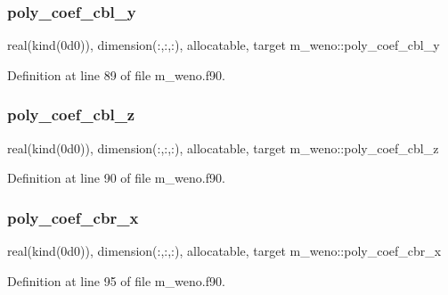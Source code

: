 \subsubsection{\texorpdfstring{poly\+\_\+coef\+\_\+cbl\+\_\+y}{poly\_coef\_cbl\_y}}
{\footnotesize\ttfamily real(kind(0d0)), dimension(\+:,\+:,\+:), allocatable, target m\+\_\+weno\+::poly\+\_\+coef\+\_\+cbl\+\_\+y}



Definition at line 89 of file m\+\_\+weno.\+f90.

\mbox{\label{namespacem__weno_af6c43f5ea0231043e8b5caf439c4719a}} 
\subsubsection{\texorpdfstring{poly\+\_\+coef\+\_\+cbl\+\_\+z}{poly\_coef\_cbl\_z}}
{\footnotesize\ttfamily real(kind(0d0)), dimension(\+:,\+:,\+:), allocatable, target m\+\_\+weno\+::poly\+\_\+coef\+\_\+cbl\+\_\+z}



Definition at line 90 of file m\+\_\+weno.\+f90.

\mbox{\label{namespacem__weno_a75f80d77048112859cb929065cb06dc6}} 
\subsubsection{\texorpdfstring{poly\+\_\+coef\+\_\+cbr\+\_\+x}{poly\_coef\_cbr\_x}}
{\footnotesize\ttfamily real(kind(0d0)), dimension(\+:,\+:,\+:), allocatable, target m\+\_\+weno\+::poly\+\_\+coef\+\_\+cbr\+\_\+x}



Definition at line 95 of file m\+\_\+weno.\+f90.

\mbox{\label{namespacem__weno_a4a885bc8ac303d196e88dcace7853223}} 
